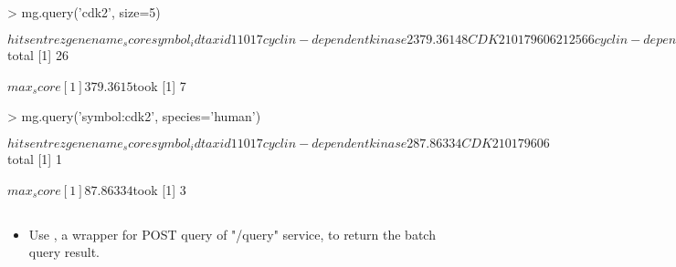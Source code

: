 \documentclass[12pt]{article}
\begin{document}
\begin{Schunk}
\begin{Sinput}
> mg.query('cdk2', size=5)
\end{Sinput}
\begin{Soutput}
$hits
  entrezgene                             name    _score  symbol    _id taxid
1       1017        cyclin-dependent kinase 2 379.36148    CDK2   1017  9606
2      12566        cyclin-dependent kinase 2 355.49432    Cdk2  12566 10090
3     362817        cyclin dependent kinase 2 269.22430    Cdk2 362817 10116
4      52004        CDK2-associated protein 2  20.37188 Cdk2ap2  52004 10090
5     143384 CDK2-associated, cullin domain 1  19.41898  CACUL1 143384  9606

$total
[1] 26

$max_score
[1] 379.3615

$took
[1] 7
\end{Soutput}
\end{Schunk}



\begin{Schunk}
\begin{Sinput}
> mg.query('symbol:cdk2', species='human')
\end{Sinput}
\begin{Soutput}
$hits
  entrezgene                      name   _score symbol  _id taxid
1       1017 cyclin-dependent kinase 2 87.86334   CDK2 1017  9606

$total
[1] 1

$max_score
[1] 87.86334

$took
[1] 3
\end{Soutput}
\end{Schunk}

\subsection{}

\begin{itemize}
\item Use , a wrapper for POST query of "/query" service, to return  the batch query result.
\end{itemize}
\end{document}
